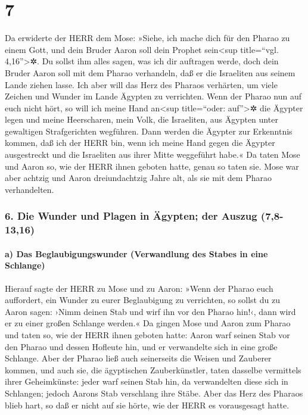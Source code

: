 \hypertarget{section-6}{%
\section{7}\label{section-6}}

 Da erwiderte der HERR dem Mose: »Siehe, ich mache dich
für den Pharao zu einem Gott, und dein Bruder Aaron soll dein Prophet
sein\textless sup title=``vgl. 4,16''\textgreater✲.  Du
sollst ihm alles sagen, was ich dir auftragen werde, doch dein Bruder
Aaron soll mit dem Pharao verhandeln, daß er die Israeliten aus seinem
Lande ziehen lasse.  Ich aber will das Herz des Pharaos
verhärten, um viele Zeichen und Wunder im Lande Ägypten zu verrichten.
 Wenn der Pharao nun auf euch nicht hört, so will ich
meine Hand an\textless sup title=``oder: auf''\textgreater✲ die Ägypter
legen und meine Heerscharen, mein Volk, die Israeliten, aus Ägypten
unter gewaltigen Strafgerichten wegführen.  Dann werden
die Ägypter zur Erkenntnis kommen, daß ich der HERR bin, wenn ich meine
Hand gegen die Ägypter ausgestreckt und die Israeliten aus ihrer Mitte
weggeführt habe.«  Da taten Mose und Aaron so, wie der
HERR ihnen geboten hatte, genau so taten sie.  Mose war
aber achtzig und Aaron dreiundachtzig Jahre alt, als sie mit dem Pharao
verhandelten.

\hypertarget{die-wunder-und-plagen-in-uxe4gypten-der-auszug-78-1316}{%
\subsubsection{6. Die Wunder und Plagen in Ägypten; der Auszug
(7,8-13,16)}\label{die-wunder-und-plagen-in-uxe4gypten-der-auszug-78-1316}}

\hypertarget{a-das-beglaubigungswunder-verwandlung-des-stabes-in-eine-schlange}{%
\paragraph{a) Das Beglaubigungswunder (Verwandlung des Stabes in eine
Schlange)}\label{a-das-beglaubigungswunder-verwandlung-des-stabes-in-eine-schlange}}

 Hierauf sagte der HERR zu Mose und zu Aaron:
 »Wenn der Pharao euch auffordert, ein Wunder zu eurer
Beglaubigung zu verrichten, so sollst du zu Aaron sagen: ›Nimm deinen
Stab und wirf ihn vor den Pharao hin!‹, dann wird er zu einer großen
Schlange werden.«  Da gingen Mose und Aaron zum Pharao
und taten so, wie der HERR ihnen geboten hatte: Aaron warf seinen Stab
vor den Pharao und dessen Hofleute hin, und er verwandelte sich in eine
große Schlange.  Aber der Pharao ließ auch seinerseits
die Weisen und Zauberer kommen, und auch sie, die ägyptischen
Zauberkünstler, taten dasselbe vermittels ihrer Geheimkünste:
 jeder warf seinen Stab hin, da verwandelten diese sich
in Schlangen; jedoch Aarons Stab verschlang ihre Stäbe. 
Aber das Herz des Pharaos blieb hart, so daß er nicht auf sie hörte, wie
der HERR es vorausgesagt hatte.


